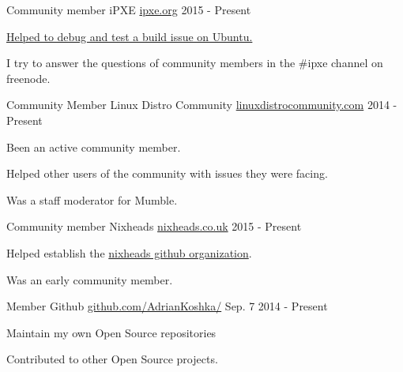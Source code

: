 \begin{cventries}

\cventry
{Community member} %
{iPXE} %
{\href{http://ipxe.org/}{ipxe.org}} %
{2015 - Present} %
{ %
\begin{cvitems}
\item {\href{https://git.ipxe.org/ipxe.git/commit/f6e1da5cbf70a372f2b622c8021c98503cab8323}{Helped to debug and test a build issue on Ubuntu.}}
\item {I try to answer the questions of community members in the \#ipxe channel on freenode.}
\end{cvitems} 
}


\cventry
{Community Member} %
{Linux Distro Community} %
{\href{https://www.linuxdistrocommunity.com/}{linuxdistrocommunity.com}} %
{2014 - Present} %
{ %
\begin{cvitems}
\item {Been an active community member.}
\item {Helped other users of the community with issues they were facing.}
\item {Was a staff moderator for Mumble.} 
\end{cvitems}
}


\cventry
{Community member} %
{Nixheads} %
{\href{http://nixheads.co.uk/}{nixheads.co.uk}} %
{2015 - Present} %
{ %
\begin{cvitems}
\item {Helped establish the \href{https://github.com/nixheads}{nixheads github organization}.}
\item {Was an early community member.}
\end{cvitems}
}


\cventry
{Member} %
{Github} %
{\href{https://github.com/AdrianKoshka/}{github.com/AdrianKoshka/}} %
{Sep. 7 2014 - Present} %
{ %
\begin{cvitems}
\item {Maintain my own Open Source repositories}
\item {Contributed to other Open Source projects.}
\end{cvitems}
}


\end{cventries}

